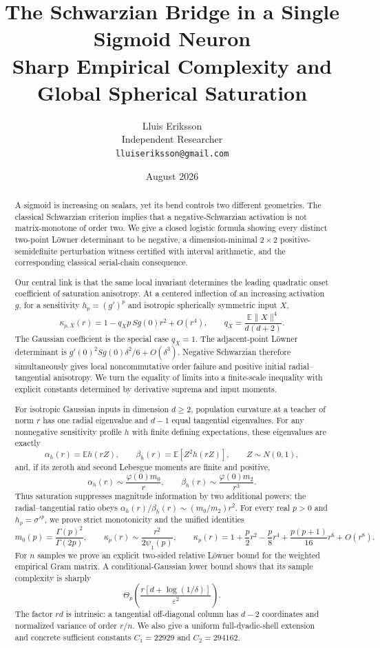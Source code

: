 \documentclass[11pt]{article}
\title{\bfseries The Schwarzian Bridge in a Single Sigmoid Neuron\\
\large Sharp Empirical Complexity and Global Spherical Saturation}
\author{Lluis Eriksson\\Independent Researcher\\\texttt{lluiseriksson@gmail.com}}
\date{August 2026}
\newcommand{\E}{\mathbb E}
\begin{document}
\maketitle

\begin{abstract}
A sigmoid is increasing on scalars, yet its bend controls two different geometries.  The classical Schwarzian
criterion implies that a negative-Schwarzian activation is not matrix-monotone of order two.  We give a closed
logistic formula showing every distinct two-point L\"owner determinant to be negative, a dimension-minimal
$2\times2$ positive-semidefinite perturbation witness certified with interval arithmetic, and the corresponding
classical serial-chain consequence.

Our central link is that the same local invariant determines the leading quadratic onset coefficient of saturation
anisotropy.  At a centered inflection of an increasing activation $g$, for a sensitivity $h_p=(g')^p$ and
isotropic spherically symmetric input $X$,
\[
 \kappa_{p,X}(r)=1-q_Xp\,Sg(0)r^2+O(r^4),\qquad
 q_X=\frac{\E\lVert X\rVert^4}{d(d+2)}.
\]
The Gaussian coefficient is the special case $q_X=1$.  The adjacent-point L\"owner determinant is
$g'(0)^2Sg(0)\delta^2/6+O(\delta^3)$.  Negative Schwarzian therefore simultaneously gives local
noncommutative order failure and positive initial radial--tangential anisotropy.  We turn the equality of limits
into a finite-scale inequality with explicit constants determined by derivative suprema and input moments.

For isotropic Gaussian inputs in dimension $d\ge2$, population curvature at a teacher of norm $r$ has one radial
eigenvalue and $d-1$ equal tangential eigenvalues.  For any nonnegative sensitivity profile $h$ with finite defining expectations, these
eigenvalues are exactly
\[
 \alpha_h(r)=\E h(rZ),\qquad \beta_h(r)=\E[Z^2h(rZ)],\qquad Z\sim N(0,1),
\]
and, if its zeroth and second Lebesgue moments are finite and positive,
\[
 \alpha_h(r)\sim \frac{\varphi(0)m_0}{r},\qquad
 \beta_h(r)\sim \frac{\varphi(0)m_2}{r^3}.
\]
Thus saturation suppresses magnitude information by two additional powers: the radial--tangential ratio obeys
$\alpha_h(r)/\beta_h(r)\sim(m_0/m_2)r^2$.  For every real $p>0$ and
$h_p=\sigma'^p$, we prove strict monotonicity and the unified identities
\[
 m_0(p)=\frac{\Gamma(p)^2}{\Gamma(2p)},\qquad
 \kappa_p(r)\sim\frac{r^2}{2\psi_1(p)},\qquad
 \kappa_p(r)=1+\frac p2r^2-\frac p8r^4+\frac{p(p+1)}{16}r^6+O(r^8).
\]
For $n$ samples we prove an explicit two-sided relative L\"owner bound for the weighted empirical Gram matrix.
A conditional-Gaussian lower bound shows that its sample complexity is sharply
\[
 \Theta_p\!\left(\frac{r[d+\log(1/\delta)]}{\varepsilon^2}\right).
\]
The factor $rd$ is intrinsic: a tangential off-diagonal column has $d-2$ coordinates and normalized variance of
order $r/n$.  We also give a uniform full-dyadic-shell extension and concrete sufficient constants
$C_1=22929$ and $C_2=294162$.


\end{abstract}
\end{document}
